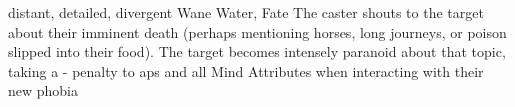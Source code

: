   {distant, detailed, divergent}%
  {Wane}%
  {Water, Fate}%
  {}%
  {The caster shouts to the target about their imminent death (perhaps mentioning horses, long journeys, or poison slipped into their food).
    The target becomes intensely paranoid about that topic, taking a - penalty to \glspl{ap} and all Mind Attributes when interacting with their new phobia}%
  {}
